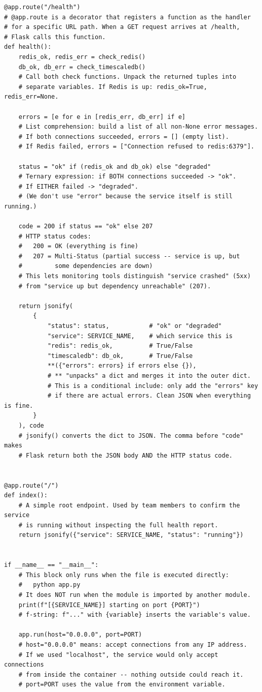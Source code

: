 \documentclass[12pt, a4paper]{article}
\begin{document}
\begin{lstlisting}[style=python, caption={services/anomaly-detector/app.py --- HTTP endpoints}]
@app.route("/health")
# @app.route is a decorator that registers a function as the handler
# for a specific URL path. When a GET request arrives at /health,
# Flask calls this function.
def health():
    redis_ok, redis_err = check_redis()
    db_ok, db_err = check_timescaledb()
    # Call both check functions. Unpack the returned tuples into
    # separate variables. If Redis is up: redis_ok=True, redis_err=None.

    errors = [e for e in [redis_err, db_err] if e]
    # List comprehension: build a list of all non-None error messages.
    # If both connections succeeded, errors = [] (empty list).
    # If Redis failed, errors = ["Connection refused to redis:6379"].

    status = "ok" if (redis_ok and db_ok) else "degraded"
    # Ternary expression: if BOTH connections succeeded -> "ok".
    # If EITHER failed -> "degraded".
    # (We don't use "error" because the service itself is still running.)

    code = 200 if status == "ok" else 207
    # HTTP status codes:
    #   200 = OK (everything is fine)
    #   207 = Multi-Status (partial success -- service is up, but
    #         some dependencies are down)
    # This lets monitoring tools distinguish "service crashed" (5xx)
    # from "service up but dependency unreachable" (207).

    return jsonify(
        {
            "status": status,           # "ok" or "degraded"
            "service": SERVICE_NAME,    # which service this is
            "redis": redis_ok,          # True/False
            "timescaledb": db_ok,       # True/False
            **({"errors": errors} if errors else {}),
            # ** "unpacks" a dict and merges it into the outer dict.
            # This is a conditional include: only add the "errors" key
            # if there are actual errors. Clean JSON when everything is fine.
        }
    ), code
    # jsonify() converts the dict to JSON. The comma before "code" makes
    # Flask return both the JSON body AND the HTTP status code.


@app.route("/")
def index():
    # A simple root endpoint. Used by team members to confirm the service
    # is running without inspecting the full health report.
    return jsonify({"service": SERVICE_NAME, "status": "running"})


if __name__ == "__main__":
    # This block only runs when the file is executed directly:
    #   python app.py
    # It does NOT run when the module is imported by another module.
    print(f"[{SERVICE_NAME}] starting on port {PORT}")
    # f-string: f"..." with {variable} inserts the variable's value.

    app.run(host="0.0.0.0", port=PORT)
    # host="0.0.0.0" means: accept connections from any IP address.
    # If we used "localhost", the service would only accept connections
    # from inside the container -- nothing outside could reach it.
    # port=PORT uses the value from the environment variable.
\end{lstlisting}
\end{document}
